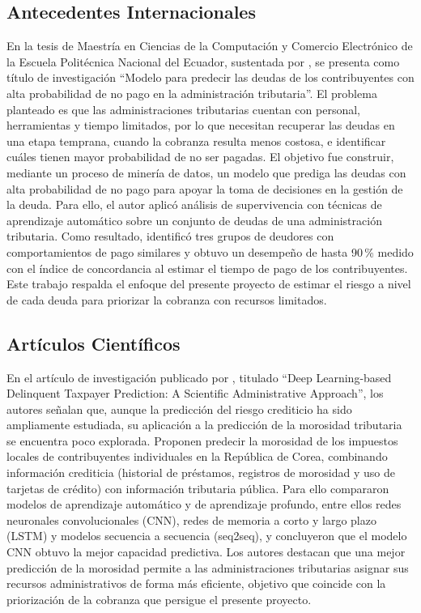 \documentclass[12pt,a4paper]{report}
\begin{document}
\subsection*{Antecedentes Internacionales}

En la tesis de Maestría en Ciencias de la Computación y Comercio Electrónico de la Escuela Politécnica Nacional del Ecuador, sustentada por \textcite{ordonez2020}, se presenta como título de investigación ``Modelo para predecir las deudas de los contribuyentes con alta probabilidad de no pago en la administración tributaria''. El problema planteado es que las administraciones tributarias cuentan con personal, herramientas y tiempo limitados, por lo que necesitan recuperar las deudas en una etapa temprana, cuando la cobranza resulta menos costosa, e identificar cuáles tienen mayor probabilidad de no ser pagadas. El objetivo fue construir, mediante un proceso de minería de datos, un modelo que prediga las deudas con alta probabilidad de no pago para apoyar la toma de decisiones en la gestión de la deuda. Para ello, el autor aplicó análisis de supervivencia con técnicas de aprendizaje automático sobre un conjunto de deudas de una administración tributaria. Como resultado, identificó tres grupos de deudores con comportamientos de pago similares y obtuvo un desempeño de hasta 90\,\% medido con el índice de concordancia al estimar el tiempo de pago de los contribuyentes. Este trabajo respalda el enfoque del presente proyecto de estimar el riesgo a nivel de cada deuda para priorizar la cobranza con recursos limitados.

\subsection*{Artículos Científicos}

En el artículo de investigación publicado por \textcite{leekim2024}, titulado ``Deep Learning-based Delinquent Taxpayer Prediction: A Scientific Administrative Approach'', los autores señalan que, aunque la predicción del riesgo crediticio ha sido ampliamente estudiada, su aplicación a la predicción de la morosidad tributaria se encuentra poco explorada. Proponen predecir la morosidad de los impuestos locales de contribuyentes individuales en la República de Corea, combinando información crediticia (historial de préstamos, registros de morosidad y uso de tarjetas de crédito) con información tributaria pública. Para ello compararon modelos de aprendizaje automático y de aprendizaje profundo, entre ellos redes neuronales convolucionales (CNN), redes de memoria a corto y largo plazo (LSTM) y modelos secuencia a secuencia (seq2seq), y concluyeron que el modelo CNN obtuvo la mejor capacidad predictiva. Los autores destacan que una mejor predicción de la morosidad permite a las administraciones tributarias asignar sus recursos administrativos de forma más eficiente, objetivo que coincide con la priorización de la cobranza que persigue el presente proyecto.
\end{document}
